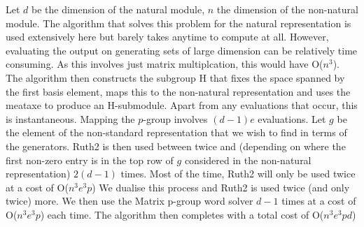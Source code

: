 \documentclass[12pt]{article}
\begin{document}
Let $d$ be the dimension of the natural module, $n$ the dimension of the non-natural module.
\newline
\newline
The algorithm that solves this problem for the natural representation is used extensively here but barely takes anytime to compute at all. However, evaluating the output on generating sets of large dimension can be relatively time consuming. As this involves just matrix multiplcation, this would have O($n^3$).
\newline
\newline
The algorithm then constructs the subgroup H that fixes the space spanned by the first basis element, maps this to the non-natural representation and uses the meataxe to produce an H-submodule. Apart from any evaluations that occur, this is instantaneous.
\newline
\newline
Mapping the $p$-group involves $(d-1)e$ evaluations.
\newline
\newline
Let $g$ be the element of the non-standard representation that we wish to find in terms of the generators. Ruth2 is then used between twice and (depending on where the first non-zero entry is in the top row of $g$ considered in the non-natural representation) $2(d-1)$ times. Most of the time, Ruth2 will only be used twice at a cost of O($n^3 e^3 p$)
\newline
\newline
We dualise this process and Ruth2 is used twice (and only twice) more. We then use the Matrix p-group word solver $d-1$ times at a cost of O($n^3 e^3 p$) each time. The algorithm then completes with a total cost of O($n^3 e^3 p d$)
\end{document}
